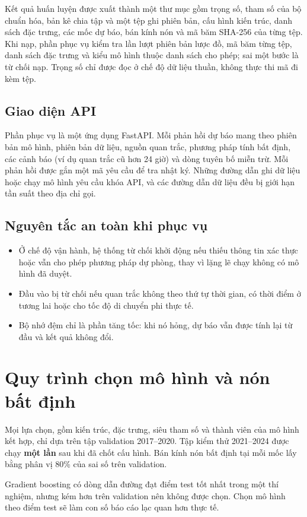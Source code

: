 Kết quả huấn luyện được xuất thành một thư mục gồm trọng số, tham số của bộ
chuẩn hóa, bản kê chia tập và một tệp  ghi phiên bản, cấu hình
kiến trúc, danh sách đặc trưng, các mốc dự báo, bán kính nón và mã băm SHA-256
của từng tệp. Khi nạp, phần phục vụ kiểm tra lần lượt phiên bản lược đồ, mã
băm từng tệp, danh sách đặc trưng và kiểu mô hình thuộc danh sách cho phép;
sai một bước là từ chối nạp. Trọng số chỉ được đọc ở chế độ dữ liệu thuần,
không thực thi mã đi kèm tệp.

\subsection{Giao diện API}

Phần phục vụ là một ứng dụng FastAPI. Mỗi phản hồi dự báo mang theo phiên bản
mô hình, phiên bản dữ liệu, nguồn quan trắc, phương pháp tính bất định, các
cảnh báo (ví dụ quan trắc cũ hơn 24 giờ) và dòng tuyên bố miễn trừ. Mỗi
phản hồi được gắn một mã yêu cầu để tra nhật ký. Những đường dẫn ghi dữ liệu
hoặc chạy mô hình yêu cầu khóa API, và các đường dẫn dữ liệu đều bị giới hạn
tần suất theo địa chỉ gọi.

\subsection{Nguyên tắc an toàn khi phục vụ}

\begin{itemize}[leftmargin=1.6em, itemsep=2pt]
  \item Ở chế độ vận hành, hệ thống từ chối khởi động nếu thiếu thông tin xác
        thực hoặc vẫn cho phép phương pháp dự phòng, thay vì lặng lẽ chạy
        không có mô hình đã duyệt.
  \item Đầu vào bị từ chối nếu quan trắc không theo thứ tự thời gian, có
        thời điểm ở tương lai hoặc cho tốc độ di chuyển phi thực tế.
  \item Bộ nhớ đệm chỉ là phần tăng tốc: khi nó hỏng, dự báo vẫn được tính
        lại từ đầu và kết quả không đổi.
\end{itemize}

\section{Quy trình chọn mô hình và nón bất định}

Mọi lựa chọn, gồm kiến trúc, đặc trưng, siêu tham số và thành viên của mô
hình kết hợp, chỉ dựa trên tập validation 2017--2020. Tập kiểm thử 2021--2024
được chạy \textbf{một lần} sau khi đã chốt cấu hình. Bán kính nón bất định
tại mỗi mốc lấy bằng phân vị 80\% của sai số trên validation.

\begin{luuy}
Gradient boosting có dòng dẫn đường đạt điểm test tốt nhất trong một thí
nghiệm, nhưng kém hơn trên validation nên không được chọn. Chọn mô hình theo
điểm test sẽ làm con số báo cáo lạc quan hơn thực tế.
\end{luuy}
